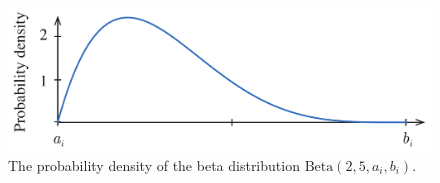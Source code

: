 \begin{figure}[t]
  \centering
  \includegraphics[width=1.0\columnwidth]{include/assets/beta.pdf}
  \caption{The probability density of the beta distribution $\text{Beta}(2, 5, a_i, b_i)$.}
\end{figure}
